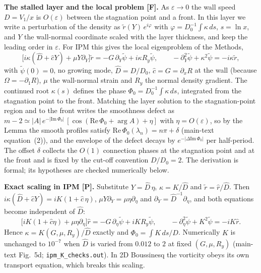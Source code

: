 \documentclass[10pt]{article}
\newcommand{\Dh}{\hat D}
\newcommand{\ReP}{\mathrm{Re}\,\Phi_0}
\newcommand{\ImP}{\mathrm{Im}\,\Phi_0}
\begin{document}
\textbf{The stalled layer and the local problem [F].} As $\varepsilon\to0$ the wall speed $D=V_1/x$ is $O(\varepsilon)$
between the stagnation point and a front. In this layer we write a perturbation of the density as
$\tilde r(Y)\,e^{i\varphi}$ with $\varphi=D_0^{-1}\int\kappa\,ds$, $s=\ln x$, and $Y$ the wall-normal coordinate scaled
with the layer thickness, and keep the leading order in $\varepsilon$. For IPM this gives the local eigenproblem of
the Methods,
\begin{equation*}
\bigl[i\kappa(\Dh+\hat cY)+\mu Y\partial_Y\bigr]\tilde r=-G\,\partial_Y\tilde\psi+i\kappa R_y\tilde\psi ,\qquad
-\partial_Y^2\tilde\psi+\kappa^2\tilde\psi=-i\kappa\tilde r ,
\end{equation*}
with $\tilde\psi(0)=0$, no growing mode, $\Dh=D/D_0$, $\hat c=G=\partial_xR$ at the wall (because $\Omega=-\partial_1R$),
$\mu$ the wall-normal strain and $R_y$ the normal density gradient. The continued root $\kappa(s)$ defines the phase
$\Phi_0=D_0^{-1}\int\kappa\,ds$, integrated from the stagnation point to the front. Matching the layer solution to the
stagnation-point region and to the front writes the smoothness defect as
$m-2\simeq|A|\,e^{-|\ImP|}\,[\cos(\ReP+\arg A)+\eta]$ with $\eta=O(\varepsilon)$, so by the Lemma the smooth profiles
satisfy $\ReP(\lambda_n)=n\pi+\delta$ (main-text equation~(2)), and the envelope of the defect decays by
$e^{-|\Delta\ImP|}$ per half-period. The offset $\delta$ collects the $O(1)$ connection phases at the stagnation point
and at the front and is fixed by the cut-off convention $D/D_0=2$. The derivation is formal; its hypotheses are checked
numerically below.

\textbf{Exact scaling in IPM [P].} Substitute $Y=\Dh\,\eta$, $\kappa=K/\Dh$ and $\tilde r=\hat r/\Dh$. Then
$i\kappa(\Dh+\hat cY)=iK(1+\hat c\,\eta)$, $\mu Y\partial_Y=\mu\eta\partial_\eta$ and $\partial_Y=\Dh^{-1}\partial_\eta$,
and both equations become independent of $\Dh$:
\begin{equation*}
\bigl[iK(1+\hat c\eta)+\mu\eta\partial_\eta\bigr]\hat r=-G\,\partial_\eta\tilde\psi+iKR_y\tilde\psi ,\qquad
-\partial_\eta^2\tilde\psi+K^2\tilde\psi=-iK\hat r .
\end{equation*}
Hence $\kappa=K(G,\mu,R_y)/\Dh$ exactly and $\Phi_0=\int K\,ds/D$. Numerically $K$ is unchanged to $10^{-7}$ when
$\Dh$ is varied from $0.012$ to $2$ at fixed $(G,\mu,R_y)$ (main-text Fig.~5d; \texttt{ipm\_K\_checks.out}). In 2D
Boussinesq the vorticity obeys its own transport equation, which breaks this scaling.
\end{document}
